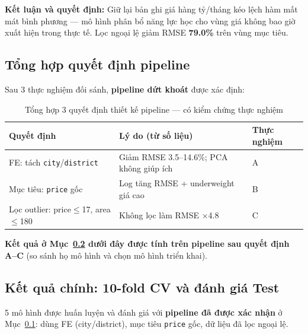 \textbf{Kết luận và quyết định:}
Giữ lại bản ghi giá hàng tỷ/tháng kéo lệch hàm mất mát bình phương —
mô hình phân bổ năng lực học cho vùng giá không bao giờ xuất hiện trong thực tế.
Lọc ngoại lệ giảm RMSE \textbf{79.0\%} trên vùng mục tiêu.


\subsection{Tổng hợp quyết định pipeline}
\label{subsec:pipeline_summary}

Sau 3 thực nghiệm đối sánh, \textbf{pipeline dứt khoát} được xác định:

\begin{table}[H]
  \centering
  \caption{Tổng hợp 3 quyết định thiết kế pipeline — có kiểm chứng thực nghiệm}
  \label{tab:pipeline}
  \begin{tabularx}{\textwidth}{@{}l X l@{}}
    \toprule
    \textbf{Quyết định} & \textbf{Lý do (từ số liệu)} & \textbf{Thực nghiệm} \\
    \midrule
    FE: tách \texttt{city}/\texttt{district} & Giảm RMSE 3.5--14.6\%; PCA không giúp ích & A \\
    Mục tiêu: \texttt{price} gốc & Log tăng RMSE + underweight giá cao & B \\
    Lọc outlier: price$\leq$17, area$\leq$180 & Không lọc làm RMSE $\times$4.8 & C \\
    \bottomrule
  \end{tabularx}
\end{table}

\textbf{Kết quả ở Mục~\ref{subsec:main_results} dưới đây được tính trên pipeline sau
quyết định A--C} (so sánh họ mô hình và chọn mô hình triển khai).

\subsection{Kết quả chính: 10-fold CV và đánh giá Test}
\label{subsec:main_results}

5 mô hình được huấn luyện và đánh giá với \textbf{pipeline đã được xác nhận} ở Mục~\ref{subsec:pipeline_summary}:
dùng FE (city/district), mục tiêu \texttt{price} gốc, dữ liệu đã lọc ngoại lệ.


